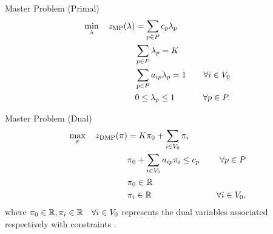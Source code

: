 \begin{frame}{Master Problem (Primal)}
	\begin{align}
		\min_{\lambda} \quad z_{\mathrm{MP}}(\lambda) & = \sum_{p \in P}  c_p \lambda_p      & \label{eq:mp-obj-func}                                                                                                    \\
		                                        & \sum_{p \in P} \lambda_{p} = K       & \label{eq:mp-K-routes}                                                                                                    \\
		                                        & \sum_{p \in P}  a_{ip} \lambda_p = 1 & \quad \forall i \in V_0                                              \label{eq:mp-customers-visited-by-exactly-one-route} \\
		                                        & 0 \le \lambda_p \le 1                & \quad \forall p \in P \label{eq:mp-lambda-mip-var-bounds}.
	\end{align}
\end{frame}

\begin{frame}{Master Problem (Dual)}
	\begin{align}
		\max_{\pi} \quad z_{\mathrm{DMP}}(\pi) & =  K \pi_0 + \sum_{i \in V_0} \pi_i           & \label{eq:dmp-obj-func}                             \\
		                                 & \pi_0 + \sum_{i \in V_0} a_{ip} \pi_i \le c_p & \quad \forall p \in P \label{eq:dmp-constraint1}    \\
		                                 & \pi_0 \in \mathbb R                                  & \label{eq:dmp-constraint2}                          \\
		                                 & \pi_i \in \mathbb R                                  & \quad \forall i \in V_0 \label{eq:dmp-constraint3},
	\end{align}
	where $\pi_0 \in \mathbb R, \pi_i \in \mathbb R \quad \forall i \in V_0$ represents the dual variables
	associated respectively with constraints .
\end{frame}

